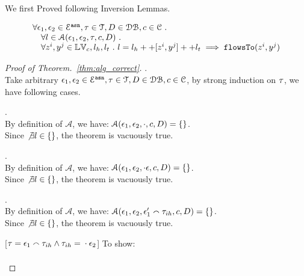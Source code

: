 We first Proved following Inversion Lemmas.

\clearpage

\begin{thm}[Correctness]
\label{thm:alg_correct}
\[
\begin{array}{l}
  \forall \mathtt{\epsilon}_1, \mathtt{\epsilon}_2 \in \mathcal{E}^{\mathtt{{asn}}}, \mathtt{\tau} \in \mathcal{T}, D \in \mathcal{DB} , c \in \mathcal{C} ~.~
  \\ \quad 
   \forall l \in \mathcal{A}(\mathtt{\epsilon}_1, \mathtt{\epsilon}_2, \mathtt{\tau}, c, D) ~.~
   \\ \quad 
   \forall z^i, y^j \in \mathbb{LV}_c, l_h, l_t ~.~ 
   l = l_h ++ [z^i, y^j] ++ l_t 
   \implies \mathtt{flowsTo}(z^i, y^j)
\end{array}
\]
\end{thm}

\begin{proof}[Proof of Theorem.~\ref{thm:alg_correct}].
\\
Take arbitrary $\mathtt{\epsilon}_1, \mathtt{\epsilon}_2 \in \mathcal{E}^{\mathtt{{asn}}}, \mathtt{\tau} \in \mathcal{T}, D \in \mathcal{DB} , c \in \mathcal{C}$,
by strong induction on $\mathtt{\tau}$, we have following cases.
\begin{case}[$\trace = \cdot$].
\\
By definition of $\mathcal{A}$, we have:
$\mathcal{A}(\mathtt{\epsilon}_1, \mathtt{\epsilon}_2, \cdot, c, D) = \{\}$.
\\
Since $\not\exists l \in \{\}$, the theorem is vacuously true.
\end{case}
%
\begin{case}[$\trace = \cdot \event$].
\\
By definition of $\mathcal{A}$, we have:
$\mathcal{A}(\mathtt{\epsilon}_1, \mathtt{\epsilon}_2, \cdot \mathtt{\epsilon}, c, D) = \{\}$.
\\
Since $\not\exists l \in \{\}$, the theorem is vacuously true.
\end{case}
%
\begin{case}[$\trace = \event_1' \tracecat \trace_{ih} \land \trace_{ih} = \trace_{ih}' \cdot \event_2' \land 
(\event_1 \eventneq \event_1' \lor \event_2 \eventneq \event_2')$].
\\
By definition of $\mathcal{A}$, we have:
$\mathcal{A}(\mathtt{\epsilon}_1, \mathtt{\epsilon}_2, \mathtt{\epsilon}_1' \smallfrown \mathtt{\tau}_{ih}, c, D) = \{\}$.
\\
Since $\not\exists l \in \{\}$, the theorem is vacuously true.
\end{case}
%
%
\begin{case}
\label{case:alg_correct_base}
[$\mathtt{\tau} = \mathtt{\epsilon}_1 \smallfrown \mathtt{\tau}_{ih} \land \mathtt{\tau}_{ih} = {} \cdot {} \mathtt{\epsilon}_2$]
To show:
\[
\begin{array}{l}

\end{array}\]
\end{case}
\end{proof}
